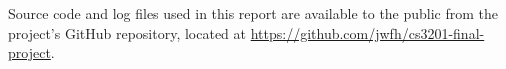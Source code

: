 Source code and log files used in this report are available to the public
from the project's GitHub repository, located at 
\url{https://github.com/jwfh/cs3201-final-project}.